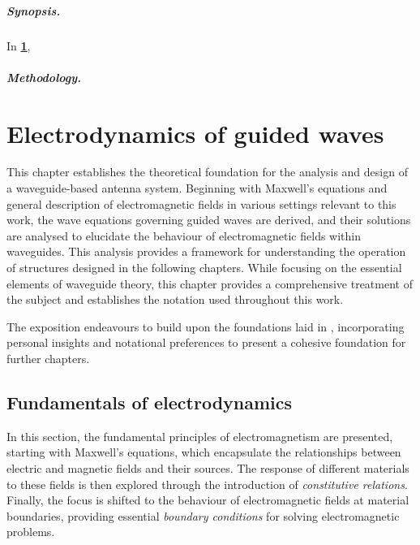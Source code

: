 \documentclass[11pt,a4paper,twoside,openany]{report}
\begin{document}
\paragraph*{Synopsis.} In \textbf{\cref{chap:electrodynamics}}, \lipsum[4]

\paragraph*{Methodology.} \lipsum[4]


\chapter{Electrodynamics of guided waves}
\label{chap:electrodynamics}
This chapter establishes the theoretical foundation for the analysis and design of a waveguide-based antenna system. Beginning with Maxwell's equations and general description of electromagnetic fields in various settings relevant to this work, the wave equations governing guided waves are derived, and their solutions are analysed to elucidate the behaviour of electromagnetic fields within waveguides. This analysis provides a framework for understanding the operation of structures designed in the following chapters. While focusing on the essential elements of waveguide theory, this chapter provides a comprehensive treatment of the subject and establishes the notation used throughout this work.

The exposition endeavours to build upon the foundations laid in \parencite{balanis:advanced-engineering-electromagnetics,griffiths:introduction-to-electrodynamics}, incorporating personal insights and notational preferences to present a cohesive foundation for further chapters.

\section{Fundamentals of electrodynamics}
\label{sec:fundamentals-of-electrodynamics}
In this section, the fundamental principles of electromagnetism are presented, starting with Maxwell's equations, which encapsulate the relationships between electric and magnetic fields and their sources. The response of different materials to these fields is then explored through the introduction of \emph{constitutive relations}. Finally, the focus is shifted to the behaviour of electromagnetic fields at material boundaries, providing essential \emph{boundary conditions} for solving electromagnetic problems.
\end{document}
